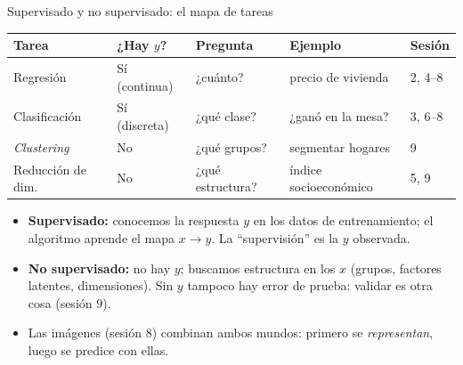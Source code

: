 \documentclass{beamer}
\newcommand{\1}{\mathbb{I}}
\begin{document}
\begin{frame}{Supervisado y no supervisado: el mapa de tareas}
\small
\begin{center}
\footnotesize
\setlength{\tabcolsep}{4pt}
\begin{tabular}{lllll}
\hline
Tarea & ¿Hay $y$? & Pregunta & Ejemplo & Sesión \\
\hline
Regresión & Sí (continua) & ¿cuánto? & precio de vivienda & 2, 4--8 \\
Clasificación & Sí (discreta) & ¿qué clase? & ¿ganó en la mesa? & 3, 6--8 \\
\emph{Clustering} & No & ¿qué grupos? & segmentar hogares & 9 \\
Reducción de dim. & No & ¿qué estructura? & índice socioeconómico & 5, 9 \\
\hline
\end{tabular}
\end{center}
\pause

\vspace{0.3cm}
\begin{itemize}\itemsep4pt
  \item \textbf{Supervisado:} conocemos la respuesta $y$ en los datos de entrenamiento; el algoritmo aprende el mapa $x \rightarrow y$. La ``supervisión'' es la $y$ observada.
  \item \textbf{No supervisado:} no hay $y$; buscamos estructura en los $x$ (grupos, factores latentes, dimensiones). Sin $y$ tampoco hay error de prueba: validar es otra cosa (sesión 9).
  \item Las imágenes (sesión 8) combinan ambos mundos: primero se \emph{representan}, luego se predice con ellas.
\end{itemize}
\end{frame}
\end{document}
